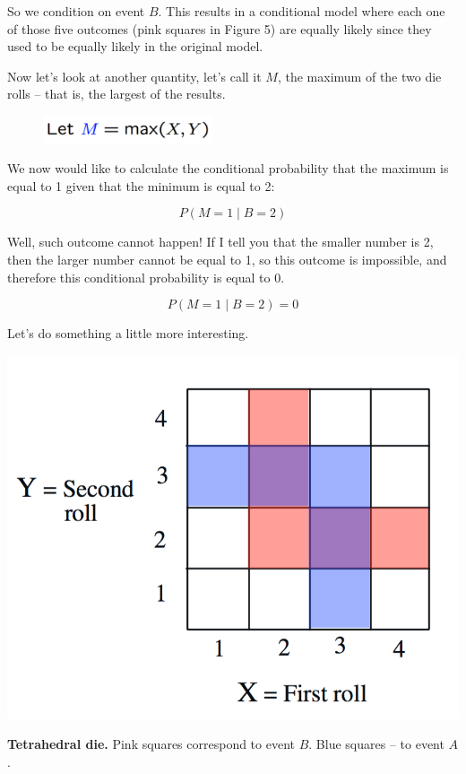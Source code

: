 \documentclass{tufte-handout}
\begin{document}
So we condition on event $B$. This results in a conditional model where each one of those five
outcomes (pink squares in Figure 5) are equally likely since they used to be equally likely in the original model. 

Now let's look at another quantity, let's call it $M$, the maximum of the two die rolls -- that is, the largest of the results. 

\begin{figure}
  \includegraphics[width=5cm]{MaxFormula}
\end{figure}


We now would like to calculate the conditional probability that the maximum is equal to 1 given that the minimum is
equal to 2:

$$ P (M = 1 \mid B = 2) $$



Well, such outcome cannot happen! If I tell you that the smaller number is 2, then the larger
number cannot be equal to 1, so this outcome is impossible, and therefore this conditional probability is
equal to $0$. 

$$ P (M = 1 \mid B = 2) = 0$$

Let's do something a little more interesting.

\begin{marginfigure}
  \includegraphics{ColoredDie1}
  \caption{\textbf{Tetrahedral die.} Pink squares correspond to event $B$. Blue squares -- to event $A$.}
\end{marginfigure}
\end{document}
